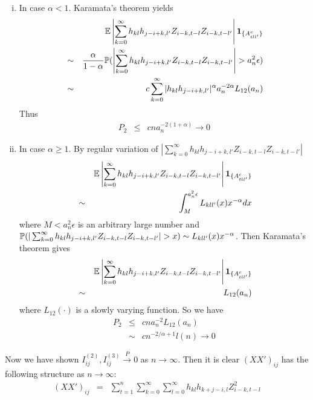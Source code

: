 \documentclass{article}
\begin{document}
\begin{enumerate}[i)]
\item In case $\alpha < 1$. Karamata's theorem yields
  \begin{eqnarray*}
    && \mathbb{E} \left|\sum_{k=0}^\infty h_{kl}h_{j-i+k,l'} Z_{i-k,t-l}Z_{i-k,t-l'}\right| \mathbf{1}_{\{A^c_{tll'}\}} \\
    &\sim& {\alpha \over 1 -\alpha} \mathbb{P}(\left|\sum_{k=0}^\infty h_{kl}h_{j-i+k,l'} Z_{i-k,t-l}Z_{i-k,t-l'}\right| > a_n^2
    \epsilon) \\
    &\sim& c \sum_{k=0}^\infty |h_{kl}h_{j-i+k,l'}|^{\alpha} a_n^{-2\alpha} L_{12}(a_n) \\
  \end{eqnarray*}
  Thus
  \begin{eqnarray*}
    P_2 &\leq& c n a_n^{-2(1 + \alpha)} \to 0
  \end{eqnarray*}
\item In case $\alpha \geq 1$. By regular variation of $|\sum_{k=0}^\infty h_{kl}h_{j-i+k,l'}
  Z_{i-k,t-l}Z_{i-k,t-l'}|$
  \begin{eqnarray*}
    && \mathbb{E}\left| \sum_{k=0}^\infty h_{kl}h_{j-i+k,l'} Z_{i-k,t-l}Z_{i-k,t-l'} \right| \mathbf{1}_{\{A^c_{tll'}\}} \\
    &\sim& \int_{M}^{a_n^2 \epsilon} L_{kll'}(x) x^{-\alpha} dx \\
  \end{eqnarray*}
  where $M < a_n^2 \epsilon$ is an arbitrary large number and $\mathbb{P}(|\sum_{k=0}^\infty
  h_{kl}h_{j-i+k,l'} Z_{i-k,t-l}Z_{i-k,t-l'}| > x) \sim L_{kll'}(x)
  x^{-\alpha}$. Then Karamata's theorem gives
  \begin{eqnarray*}
    && \mathbb{E}\left| \sum_{k=0}^\infty h_{kl}h_{j-i+k,l'} Z_{i-k,t-l}Z_{i-k,t-l'} \right| \mathbf{1}_{\{A^c_{tll'}\}} \\
    &\sim& L_{12}(a_n)
  \end{eqnarray*}
  where $L_{12}(\cdot)$ is a slowly varying function. So we have
  \begin{eqnarray*}
    P_2 &\leq& c n a_n^{-2} L_{12}(a_n)\\
    &\sim& c n^{-2/\alpha + 1} l(n) \to 0
  \end{eqnarray*}
\end{enumerate}
Now we have shown $I^{(2)}_{ij}, I^{(3)}_{ij} \xrightarrow{P} 0$ as $n
\to \infty$. Then it is clear $(XX')_{ij}$ has the following structure
as $n \to \infty$:
\begin{eqnarray*}
  (XX')_{ij} &=& \sum_{t=1}^n \sum_{k=0}^\infty \sum_{l=0}^\infty
  h_{kl} h_{k+j-i,l} Z_{i-k, t-l}^2
\end{eqnarray*}
\end{document}
